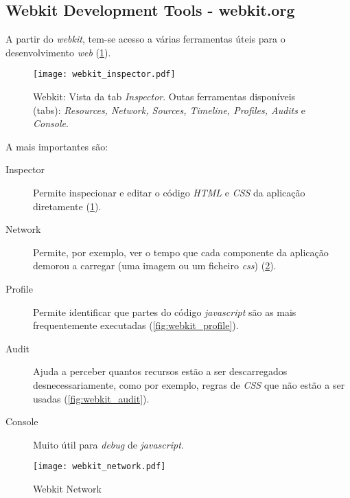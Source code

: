 
  \subsection{Webkit Development Tools - webkit.org} %
  \label{sub:webkit_tools}

    A partir do \emph{webkit}, tem-se acesso a várias ferramentas úteis para o desenvolvimento \emph{web} (\ref{fig:webkit_inspector}).

    \begin{figure}
      \begin{center}
        \texttt{[image: webkit\_inspector.pdf]}
      \end{center}
      \caption{Webkit: Vista da tab \emph{Inspector}. Outas ferramentas disponíveis (tabs): \emph{Resources, Network, Sources, Timeline, Profiles, Audits} e \emph{Console}.}

      \label{fig:webkit_inspector}
    \end{figure}

    A mais importantes são:

    \begin{description}
      \item[Inspector] Permite inspecionar e editar o código \emph{HTML} e \emph{CSS} da aplicação diretamente  (\ref{fig:webkit_inspector}).
      \item[Network] Permite, por exemplo, ver o tempo que cada componente da aplicação demorou a carregar (uma imagem ou um ficheiro \emph{css}) (\ref{fig:webkit_network}).
      \item[Profile] Permite identificar que partes do código \emph{javascript} são as mais frequentemente executadas (\ref{fig:webkit_profile}).
      \item[Audit] Ajuda a perceber quantos recursos estão a ser descarregados desnecessariamente, como por exemplo, regras de \emph{CSS} que não estão a ser usadas (\ref{fig:webkit_audit}).
      \item[Console] Muito útil para \emph{debug} de \emph{javascript}.

    \end{description}


    \begin{figure}
      \begin{center}
        \texttt{[image: webkit\_network.pdf]}
      \end{center}
      \caption{Webkit Network}
      \label{fig:webkit_network}
    \end{figure}

